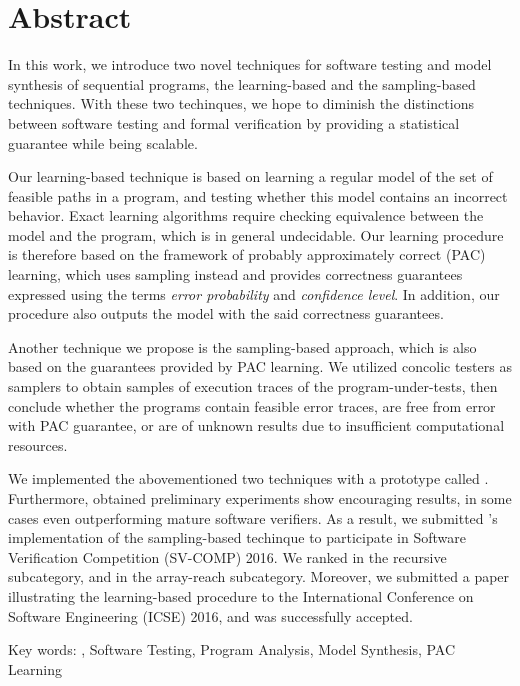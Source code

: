 
\chapter{Abstract}

In this work, we introduce two novel techniques for software testing and model synthesis of sequential programs, the learning-based and the sampling-based techniques. With these two techinques, we hope to diminish the distinctions between software testing and formal verification by providing a statistical guarantee while being scalable. 

Our learning-based technique is based on learning a regular model of the set of feasible paths in a program, and testing whether this model contains an incorrect behavior. Exact learning algorithms require checking equivalence between the model and the program, which is in general undecidable. Our learning procedure is therefore based on the framework of probably approximately correct (PAC) learning, which uses sampling instead and provides correctness guarantees expressed using the terms \emph{error probability} and \emph{confidence level}. In addition, our procedure also outputs the model with the said correctness guarantees. 

Another technique we propose is the sampling-based approach, which is also based on the guarantees provided by PAC learning. We utilized concolic testers as samplers to obtain samples of execution traces of the program-under-tests, then conclude whether the programs contain feasible error traces, are free from error with PAC guarantee, or are of unknown results due to insufficient computational resources. 

We implemented the abovementioned two techniques with a prototype called \PACMAN. Furthermore, obtained preliminary experiments show encouraging results, in some cases even outperforming mature software verifiers. As a result, we submitted \PACMAN's implementation of the sampling-based techinque to participate in Software Verification Competition (SV-COMP) 2016. We ranked  in the recursive subcategory, and  in the array-reach subcategory. Moreover, we submitted a paper illustrating the learning-based procedure to the International Conference on Software Engineering (ICSE) 2016, and was successfully accepted.   

Key words: \PACMAN, Software Testing, Program Analysis, Model Synthesis, PAC Learning

